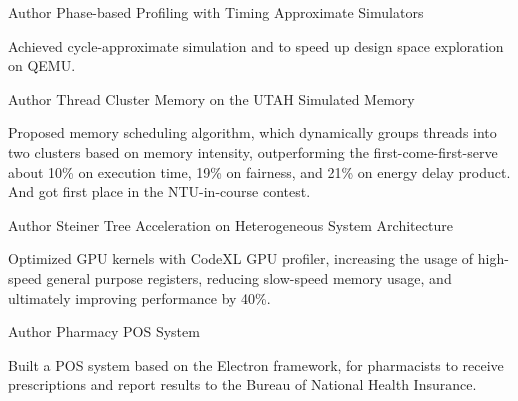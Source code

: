 

\begin{cventries}

  \cventry
    {Author} %
    {Phase-based Profiling with Timing Approximate Simulators} %
    {} %
    {} %
    {
      \begin{cvitems} %
        \item {Achieved cycle-approximate simulation and to speed up design space
          exploration on QEMU.}
      \end{cvitems}
    }

  \cventry
    {Author} %
    {Thread Cluster Memory on the UTAH Simulated Memory} %
    {} %
    {} %
    {
      \begin{cvitems} %
        \item {Proposed memory scheduling algorithm, which dynamically groups threads into
  two clusters based on memory intensity, outperforming the
  first-come-first-serve about 10\% on execution time, 19\% on fairness, and
  21\% on energy delay product. And got first place in the NTU-in-course contest.}
      \end{cvitems}
    }

  \cventry
    {Author} %
    {Steiner Tree Acceleration on Heterogeneous System Architecture} %
    {} %
    {} %
    {
      \begin{cvitems} %
        \item {Optimized GPU kernels with CodeXL GPU profiler, increasing the usage of
  high-speed general purpose registers, reducing slow-speed memory usage, and
  ultimately improving performance by 40\%.}
      \end{cvitems}
    }

  \cventry
    {Author} %
    {Pharmacy POS System} %
    {} %
    {} %
    {
      \begin{cvitems} %
        \item {Built a POS system based on the Electron framework, for pharmacists to
  receive prescriptions and report results to the Bureau of National Health
Insurance.}
      \end{cvitems}
    }

\end{cventries}
